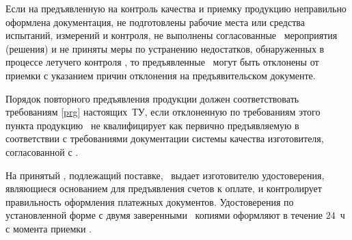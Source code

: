\point
Если на предъявленную на контроль качества и приемку продукцию неправильно оформлена документация, не подготовлены рабочие места или средства испытаний, измерений и контроля, не выполнены согласованные \client \ мероприятия (решения) и не приняты меры по устранению недостатков, обнаруженных в процессе летучего контроля \client, то предъявленные \dut \ могут быть отклонены от приемки с указанием причин отклонения на предъявительском документе.

Порядок повторного предъявления продукции должен соответствовать требованиям \ref{prg} настоящих~ТУ, если отклоненную по требованиям этого пункта продукцию \client \ не квалифицирует как первично предъявляемую в соответствии с требованиями документации системы качества изготовителя, согласованной с \client.

\point
На принятый \dut, подлежащий поставке, \client \ выдает изготовителю удостоверения, являющиеся основанием для предъявления счетов к оплате, и контролирует правильность оформления платежных документов. Удостоверения по установленной форме с двумя заверенными \client \ копиями оформляют в течение $24$~ч с момента приемки \dut.